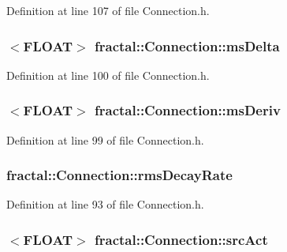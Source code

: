 Definition at line 107 of file Connection.\+h.

\hypertarget{classfractal_1_1Connection_a0cd41b30d1dc0db0a6722521a20906ea}{
\subsubsection[{ms\+Delta}]{$<${\bf F\+L\+O\+A\+T}$>$ fractal\+::\+Connection\+::ms\+Delta\hspace{0.3cm}{\ttfamily [protected]}}}\label{classfractal_1_1Connection_a0cd41b30d1dc0db0a6722521a20906ea}


Definition at line 100 of file Connection.\+h.

\hypertarget{classfractal_1_1Connection_ac4df1add96950e005f005047f25f158d}{
\subsubsection[{ms\+Deriv}]{$<${\bf F\+L\+O\+A\+T}$>$ fractal\+::\+Connection\+::ms\+Deriv\hspace{0.3cm}{\ttfamily [protected]}}}\label{classfractal_1_1Connection_ac4df1add96950e005f005047f25f158d}


Definition at line 99 of file Connection.\+h.

\hypertarget{classfractal_1_1Connection_ade0067c963f876032c92cd4198deaa32}{
\subsubsection[{rms\+Decay\+Rate}]{ fractal\+::\+Connection\+::rms\+Decay\+Rate\hspace{0.3cm}{\ttfamily [protected]}}}\label{classfractal_1_1Connection_ade0067c963f876032c92cd4198deaa32}


Definition at line 93 of file Connection.\+h.

\hypertarget{classfractal_1_1Connection_aae995012548c5f535cf4dd16aa8985c5}{
\subsubsection[{src\+Act}]{$<${\bf F\+L\+O\+A\+T}$>$ fractal\+::\+Connection\+::src\+Act\hspace{0.3cm}{\ttfamily [protected]}}}\label{classfractal_1_1Connection_aae995012548c5f535cf4dd16aa8985c5}


